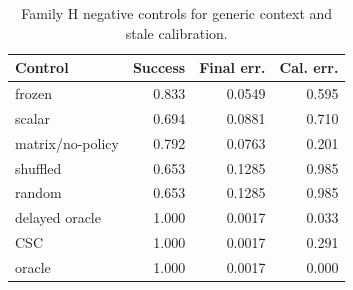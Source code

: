 \begin{table}[t]
\caption{Family H negative controls for generic context and stale calibration.}
\label{tab:negative-controls}
\centering
\begin{tabular}{lrrr}
\toprule
Control & Success & Final err. & Cal. err. \\
\midrule
frozen & 0.833 & 0.0549 & 0.595 \\
scalar & 0.694 & 0.0881 & 0.710 \\
matrix/no-policy & 0.792 & 0.0763 & 0.201 \\
shuffled & 0.653 & 0.1285 & 0.985 \\
random & 0.653 & 0.1285 & 0.985 \\
delayed oracle & 1.000 & 0.0017 & 0.033 \\
CSC & 1.000 & 0.0017 & 0.291 \\
oracle & 1.000 & 0.0017 & 0.000 \\
\bottomrule
\end{tabular}
\end{table}
